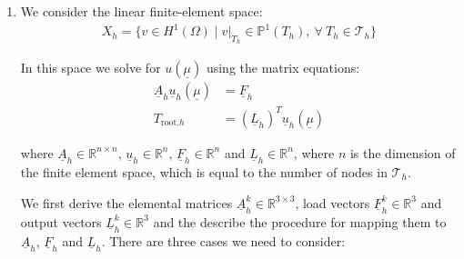 \begin{enumerate}[label=(\alph*),leftmargin=*,itemsep=0mm]
\begin{proof}
    From Eqns. (10), (12) and (15), we see that $\delta_vJ(u)$ is
    \begin{align*}
        \delta_vJ(u) &= \sum_{i=0}^4 k^i \int_{\Omega^i} \nabla u\nabla v \dd{A}
        + \text{Bi} \int_{\Gamma\setminus\Gamma_\text{root}} uv \dd{S}
        - \int_{\Gamma_\text{root}} v \dd{S} \\
        &= \sum_{i=1}^4 \left( \int_{\Omega^i} \nabla v \cdot \nabla u \dd{A}
        + \text{Bi} \int_{\Gamma^i_\text{ext}} u v \dd{S}\right)
        + \int_{\Omega^0} \nabla v \cdot \nabla u \dd{A}
        + \int_{\Gamma_\text{root}} v \dd{S} \\
        &= 0
    \end{align*}
    
    So Eqn. (15) simplifies to
    \begin{align*}
        J(u+v) &= J(u) + \frac{1}{2} \sum_{i=0}^4 k^i \int_{\Omega^i} (\nabla v)^2 \dd{S} \\
        &\geq J(u)
    \end{align*}
    
    And therefore this means that $u(\underline{\mu})$ is the minimizer of $J(w)$ over all $w \in X$
    
    \end{proof}
    
    \item We consider the linear finite-element space:
    \begin{align*}
        X_h = \{ v\in H^1(\Omega) \mid v|_{T_h} \in \mathbb{P}^1(T_h),\> \forall\> T_h \in \mathcal{T}_h \}
    \end{align*}
    
    In this space we solve for $u(\underline{\mu})$ using the matrix equations:
    \begin{align*}
        \underline{A}_h\underline{u}_h(\underline{\mu}) &= \underline{F}_h \\
        T_{\text{root}.h} &= (\underline{L}_h)^T \underline{u}_h(\underline{\mu})
    \end{align*}
    
    where $\underline{A}_h\in\mathbb{R}^{n\times n}$, $\underline{u}_h\in\mathbb{R}^n$, $\underline{F}_h\in\mathbb{R}^n$ and $\underline{L}_h\in\mathbb{R}^n$, where $n$ is the dimension of the finite element space, which is equal to the number of nodes in $\mathcal{T}_h$.
    
    We first derive the elemental matrices $\underline{A}_h^k\in\mathbb{R}^{3\times 3}$, load vectors $\underline{F}_h^k\in\mathbb{R}^3$ and output vectors $\underline{L}_h^k\in\mathbb{R}^3$ and the describe the procedure for mapping them to $\underline{A}_h$, $\underline{F}_h$ and $\underline{L}_h$.  There are three cases we need to consider:
    

\end{enumerate}
